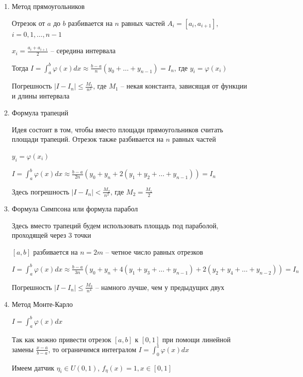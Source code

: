 \begin{enumerate}[label*=\Roman*. ]
    \item Метод прямоугольников

    Отрезок от $a$ до $b$ разбивается на $n$ равных частей $A_i = [a_i, a_{i + 1}]$, $i = 0, 1, \dots, n - 1$

    $x_i = \frac{a_i + a_{i + 1}}{2}$ -- середина интервала

    Тогда $I = \int_a^b \varphi(x) dx \approx \frac{b - a}{n} (y_0 + \dots + y_{n - 1}) = I_n$, где $y_i = \varphi(x_i)$

    Погрешность $|I - I_n| \leq \frac{M_1}{n^2}$, где $M_1$ -- некая константа, зависящая от функции и длины интервала

    \item Формула трапеций

    Идея состоит в том, чтобы вместо площади прямоугольников считать площади трапеций. Отрезок также разбивается на $n$ равных частей

    $y_i = \varphi(x_i)$

    $I = \int_a^b \varphi(x) dx \approx \frac{b - a}{2n} (y_0 + y_n + 2(y_1 + y_2 + \dots + y_{n - 1})) = I_n$

    Здесь погрешность $|I - I_n| < \frac{M_2}{n^2}$, где $M_2 = \frac{M_1}{2}$

    \item Формула Симпсона или формула парабол

    Здесь вместо трапеций будем использовать площадь под параболой, проходящей через 3 точки

    $[a, b]$ разбивается на $n = 2m$ -- четное число равных отрезков

    $I = \int_a^b \varphi(x) dx \approx \frac{b - a}{3n} (y_0 + y_n + 4(y_1 + y_3 + \dots + y_{n - 1}) + 2(y_2 + y_4 + \dots + y_{n - 2})) = I_n$

    Погрешность $|I - I_n| \leq \frac{M_3}{n^4}$ -- намного лучше, чем у предыдущих двух

    \hypertarget{monte_carlo_integral}{}

    \item Метод Монте-Карло

    $I = \int_a^b \varphi(x) dx$

    Так как можно привести отрезок $[a, b]$ к $[0, 1]$ при помощи линейной замены $\frac{x - a}{b - a}$, то ограничимся интегралом $I = \int_0^1 \varphi(x) dx$

    Имеем датчик $\eta_i \in U(0, 1)$, $f_{\eta} (x) = 1, x \in [0, 1]$


\end{enumerate}
